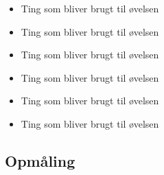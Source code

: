                                    
\begin{itemize}
  \item    Ting som bliver brugt til øvelsen
  \item    Ting som bliver brugt til øvelsen
  \item    Ting som bliver brugt til øvelsen
  \item    Ting som bliver brugt til øvelsen
  \item    Ting som bliver brugt til øvelsen
  \item    Ting som bliver brugt til øvelsen
\end{itemize}

\subsection*{Opmåling} 